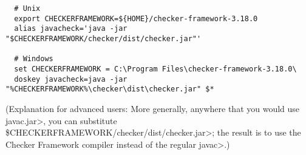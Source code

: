 \begin{itemize}
\begin{Verbatim}
  # Unix
  export CHECKERFRAMEWORK=${HOME}/checker-framework-3.18.0
  alias javacheck='java -jar "$CHECKERFRAMEWORK/checker/dist/checker.jar"'

  # Windows
  set CHECKERFRAMEWORK = C:\Program Files\checker-framework-3.18.0\
  doskey javacheck=java -jar "%CHECKERFRAMEWORK%\checker\dist\checker.jar" $*
\end{Verbatim}

  (Explanation for advanced users:
  More generally, anywhere that you would use \<javac.jar>, you can substitute
  \<\$CHECKERFRAMEWORK/checker/dist/checker.jar>;
  the result is to use the Checker
  Framework compiler instead of the regular \<javac>.)

\end{itemize}



%
%
%
%
%
%
%
%
%


